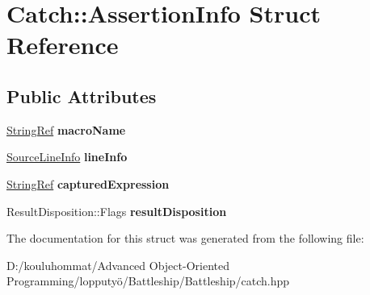 \hypertarget{struct_catch_1_1_assertion_info}{}\section{Catch\+:\+:Assertion\+Info Struct Reference}
\label{struct_catch_1_1_assertion_info}
\subsection*{Public Attributes}
\begin{DoxyCompactItemize}
\item 
\mbox{\label{struct_catch_1_1_assertion_info_aaf3fbb9f1fe09c879ba3d877584e3056}} 
\mbox{\hyperlink{class_catch_1_1_string_ref}{String\+Ref}} {\bfseries macro\+Name}
\item 
\mbox{\label{struct_catch_1_1_assertion_info_a17bdbb404ba12658034f833be2f4c3e7}} 
\mbox{\hyperlink{struct_catch_1_1_source_line_info}{Source\+Line\+Info}} {\bfseries line\+Info}
\item 
\mbox{\label{struct_catch_1_1_assertion_info_accd36744b4acaa3a691a72df0b42190f}} 
\mbox{\hyperlink{class_catch_1_1_string_ref}{String\+Ref}} {\bfseries captured\+Expression}
\item 
\mbox{\label{struct_catch_1_1_assertion_info_a60353b3632ab2f827162f2b2d6911073}} 
Result\+Disposition\+::\+Flags {\bfseries result\+Disposition}
\end{DoxyCompactItemize}


The documentation for this struct was generated from the following file\+:\begin{DoxyCompactItemize}
\item 
D\+:/kouluhommat/\+Advanced Object-\/\+Oriented Programming/lopputyö/\+Battleship/\+Battleship/catch.\+hpp\end{DoxyCompactItemize}
